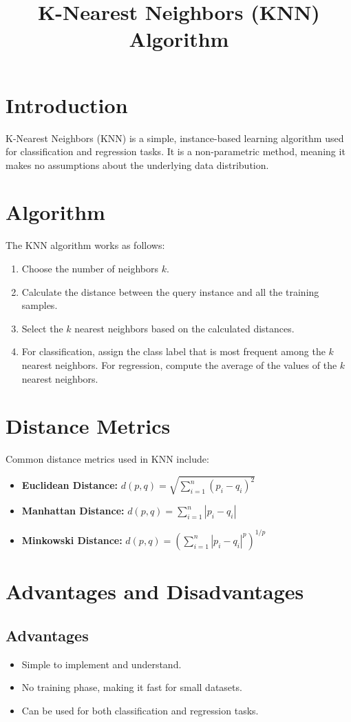 \documentclass[12pt]{article}
\title{K-Nearest Neighbors (KNN) Algorithm}
\author{}
\date{}
\begin{document}
\maketitle

\section{Introduction}
K-Nearest Neighbors (KNN) is a simple, instance-based learning algorithm used for classification and regression tasks. It is a non-parametric method, meaning it makes no assumptions about the underlying data distribution.

\section{Algorithm}
The KNN algorithm works as follows:
\begin{enumerate}
    \item Choose the number of neighbors \( k \).
    \item Calculate the distance between the query instance and all the training samples.
    \item Select the \( k \) nearest neighbors based on the calculated distances.
    \item For classification, assign the class label that is most frequent among the \( k \) nearest neighbors. For regression, compute the average of the values of the \( k \) nearest neighbors.
\end{enumerate}

\section{Distance Metrics}
Common distance metrics used in KNN include:
\begin{itemize}
    \item \textbf{Euclidean Distance:} \( d(p, q) = \sqrt{\sum_{i=1}^{n} (p_i - q_i)^2} \)
    \item \textbf{Manhattan Distance:} \( d(p, q) = \sum_{i=1}^{n} |p_i - q_i| \)
    \item \textbf{Minkowski Distance:} \( d(p, q) = \left( \sum_{i=1}^{n} |p_i - q_i|^p \right)^{1/p} \)
\end{itemize}

\section{Advantages and Disadvantages}
\subsection{Advantages}
\begin{itemize}
    \item Simple to implement and understand.
    \item No training phase, making it fast for small datasets.
    \item Can be used for both classification and regression tasks.
\end{itemize}
\end{document}

